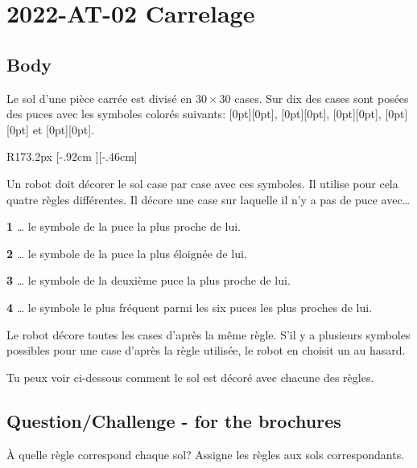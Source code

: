 \documentclass[a4paper,11pt]{report}
\newcommand{\taskGraphicsFolder}{..}
\begin{document}
\section*{\centering{} 2022-AT-02 Carrelage}


\subsection*{Body}

Le sol d’une pièce carrée est divisé en ${30 \times 30}$ cases. Sur dix des cases sont posées des puces avec les symboles colorés suivants:
\raisebox{-0.5ex}[0pt][0pt]{}, \raisebox{-0.5ex}[0pt][0pt]{}, \raisebox{-0.5ex}[0pt][0pt]{}, \raisebox{-0.5ex}[0pt][0pt]{} et \raisebox{-0.5ex}[0pt][0pt]{}.

\begin{wrapfigure}{R}{173.2px}
\raisebox{-.46cm}[\dimexpr \height-.92cm \relax][-.46cm]{}
\end{wrapfigure}

Un robot doit décorer le sol case par case avec ces symboles. Il utilise pour cela quatre règles différentes. Il décore une case sur laquelle il n’y a pas de puce avec…

\textbf{1} … le symbole de la puce la plus proche de lui.

\textbf{2} … le symbole de la puce la plus éloignée de lui.

\textbf{3} … le symbole de la deuxième puce la plus proche de lui.

\textbf{4} … le symbole le plus fréquent parmi les six puces les plus proches de lui.

Le robot décore toutes les cases d’après la même règle. S’il y a plusieurs symboles possibles pour une case d’après la règle utilisée, le robot en choisit un au hasard.

Tu peux voir ci-dessous comment le sol est décoré avec chacune des règles.

{\em


\subsection*{Question/Challenge - for the brochures}

À quelle règle correspond chaque sol? Assigne les règles aux sols correspondants.

{\centering%
\par}

}
\end{document}
